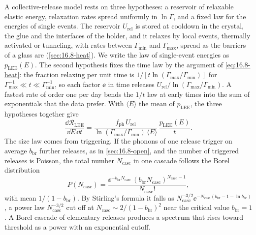 A collective-release model rests on three hypotheses: a reservoir of relaxable elastic energy, relaxation rates spread uniformly in $\ln\varGamma$, and a fixed law for the energies of single events. The reservoir $U_{\mathrm{rel}}$ is stored at cooldown in the crystal, the glue and the interfaces of the holder, and it relaxes by local events, thermally activated or tunneling, with rates between $\varGamma_{\min}$ and $\varGamma_{\max}$, spread as the barriers of a glass are (\cref{sec:16.8-heat}). We write the law of single-event energies as $p_{\mathrm{LEE}}(E)$. The second hypothesis fixes the time law by the argument of \cref{eq:16.8-heat}: the fraction relaxing per unit time is $1/[t\ln(\varGamma_{\max}/\varGamma_{\min})]$ for $\varGamma_{\max}^{-1} \ll t \ll \varGamma_{\min}^{-1}$, so each factor $\ee$ in time releases $U_{\mathrm{rel}}/\ln(\varGamma_{\max}/\varGamma_{\min})$. A fastest rate of order one per day bends the $1/t$ law at early times into the sum of exponentials that the data prefer. With $\langle E\rangle$ the mean of $p_{\mathrm{LEE}}$, the three hypotheses together give
\begin{equation}
  \frac{\dd\mathcal{R}_{\mathrm{LEE}}}{\dd E\,\dd t} = \frac{f_{\mathrm{ph}}\,U_{\mathrm{rel}}}{\ln(\varGamma_{\max}/\varGamma_{\min})\,\langle E\rangle}\,\frac{p_{\mathrm{LEE}}(E)}{t} .
  \label{eq:19.6-lee}
\end{equation}
The size law comes from triggering. If the phonons of one release trigger on average $b_{\mathrm{br}}$ further releases, as in \cref{sec:16.8-open}, and the number of triggered releases is Poisson, the total number $N_{\mathrm{casc}}$ in one cascade follows the Borel distribution
\begin{equation}
  P(N_{\mathrm{casc}}) = \frac{\ee^{-b_{\mathrm{br}}N_{\mathrm{casc}}}\,(b_{\mathrm{br}}N_{\mathrm{casc}})^{N_{\mathrm{casc}} - 1}}{N_{\mathrm{casc}}!} ,
  \label{eq:19.6-borel}
\end{equation}
with mean $1/(1 - b_{\mathrm{br}})$. By Stirling's formula it falls as $N_{\mathrm{casc}}^{-3/2}\ee^{-N_{\mathrm{casc}}(b_{\mathrm{br}} - 1 - \ln b_{\mathrm{br}})}$, a power law $N_{\mathrm{casc}}^{-3/2}$ cut off at $N_{\mathrm{casc}} \sim 2/(1 - b_{\mathrm{br}})^2$ near the critical value $b_{\mathrm{br}} = 1$. A Borel cascade of elementary releases produces a spectrum that rises toward threshold as a power with an exponential cutoff.

